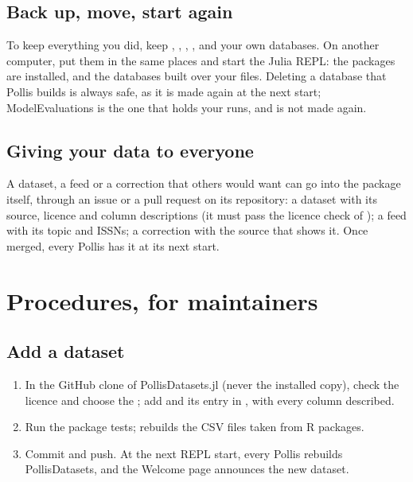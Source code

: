 \subsection{Back up, move, start again}
To keep everything you did, keep , , ,
,  and your own databases. On
another computer, put them in the same places and start the Julia REPL: the packages are installed, and the databases
built over your files. Deleting a database that Pollis builds is always safe, as it is made again at the next start;
ModelEvaluations is the one that holds your runs, and is not made again.

\subsection{Giving your data to everyone}
A dataset, a feed or a correction that others would want can go into the package itself, through an issue or a pull
request on its repository: a dataset with its source, licence and column descriptions (it must pass the licence
check of ); a feed with its topic and ISSNs; a correction with the source that shows it. Once
merged, every Pollis has it at its next start.

\section{Procedures, for maintainers}\label{sec:procedures}

\subsection{Add a dataset}
\begin{enumerate}
  \item In the GitHub clone of PollisDatasets.jl (never the installed copy), check the licence and choose the
    ; add  and its entry in , with every column described.
  \item Run the package tests;  rebuilds the CSV files taken from R packages.
  \item Commit and push. At the next REPL start, every Pollis rebuilds PollisDatasets, and the Welcome page announces
    the new dataset.
\end{enumerate}

